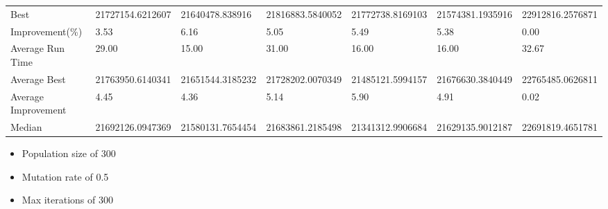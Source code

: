 \begin{table}[H]
{\begin{tabular}{lllllll}
\cellcolor[HTML]{ECF4FF}Best                & 21727154.6212607 & 21640478.838916  & 21816883.5840052 & 21772738.8169103 & 21574381.1935916 & 22912816.2576871 \\
\cellcolor[HTML]{ECF4FF}Improvement(\%)     & 3.53             & 6.16             & 5.05             & 5.49             & 5.38             & 0.00             \\
\rowcolor[HTML]{CBCEFB} 
\cellcolor[HTML]{DAE8FC}Average Run Time    & 29.00            & 15.00            & 31.00            & 16.00            & 16.00            & 32.67            \\
\rowcolor[HTML]{CBCEFB} 
\cellcolor[HTML]{DAE8FC}Average Best        & 21763950.6140341 & 21651544.3185232 & 21728202.0070349 & 21485121.5994157 & 21676630.3840449 & 22765485.0626811 \\
\rowcolor[HTML]{CBCEFB} 
\cellcolor[HTML]{DAE8FC}Average Improvement & 4.45             & 4.36             & 5.14             & 5.90             & 4.91             & 0.02             \\
\rowcolor[HTML]{CBCEFB} 
\cellcolor[HTML]{DAE8FC}Median              & 21692126.0947369 & 21580131.7654454 & 21683861.2185498 & 21341312.9906684 & 21629135.9012187 & 22691819.4651781
\end{tabular}%
}
\end{table}

\begin{itemize}
  \item Population size of 300
  \item Mutation rate of 0.5
  \item Max iterations of 300
\end{itemize}

